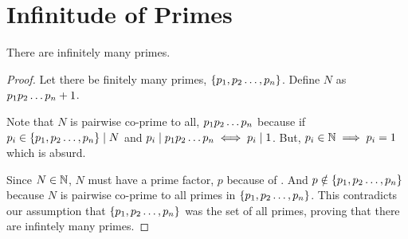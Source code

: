 \section{Infinitude of Primes}



\begin{theorem}
    [Euclid]
    There are infinitely many primes.
\end{theorem}

\begin{proof}
    Let there be finitely many primes, \(\{p_{1},p_{2}\ldots,p_{n}\}\). Define \( N \) as \( p_{1}p_{2}\ldots p_{n} + 1 \).
    \par
    Note that \(N\) is pairwise co-prime to all, \(p_{1}p_{2}\ldots p_{n}\) because if \(p_i \in \{p_{1},p_{2}\ldots,p_{n}\} \mid N \) and \(p_i \mid p_{1}p_{2}\ldots p_{n} \iff p_i \mid 1\). But, \( p_i \in \mathbb N \implies p_i = 1 \) which is absurd.
    \\
    \par Since \(N \in \mathbb N\), \(N\) must have a prime factor, \(p\) because of . And \(p \notin \{p_{1},p_{2}\ldots,p_{n}\}\) because \(N \) is pairwise co-prime to all primes in \(\{p_{1},p_{2}\ldots,p_{n}\}\). This contradicts our assumption that \(\{p_{1},p_{2}\ldots,p_{n}\}\) was the set of all primes, proving that there are infintely many primes.
    


\end{proof}

